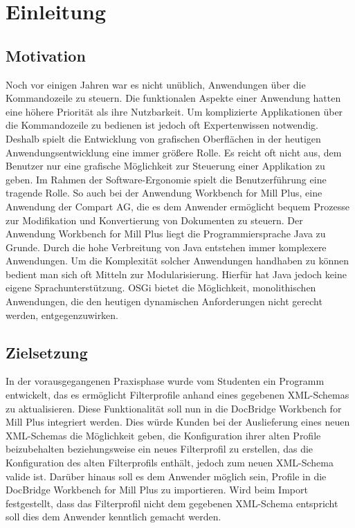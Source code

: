 
\chapter{Einleitung}
\label{cha:Einleitung}

\section{Motivation}{
Noch vor einigen Jahren war es nicht unüblich, Anwendungen über die Kommandozeile zu steuern. Die funktionalen Aspekte einer Anwendung hatten eine höhere Priorität als ihre Nutzbarkeit. Um komplizierte Applikationen über die Kommandozeile zu bedienen ist jedoch oft Expertenwissen notwendig. Deshalb spielt die Entwicklung von grafischen Oberflächen in der heutigen Anwendungsentwicklung eine immer größere Rolle. Es reicht oft nicht aus, dem Benutzer nur eine grafische Möglichkeit zur Steuerung einer Applikation zu geben. Im Rahmen der Software-Ergonomie spielt die Benutzerführung eine tragende Rolle. So auch bei der Anwendung Workbench for Mill Plus, eine Anwendung der Compart AG, die es dem Anwender ermöglicht bequem Prozesse zur Modifikation und Konvertierung von Dokumenten zu steuern. Der Anwendung Workbench for Mill Plus liegt die Programmiersprache Java zu Grunde. Durch die hohe Verbreitung von Java entstehen immer komplexere Anwendungen. Um die Komplexität solcher Anwendungen handhaben zu können bedient man sich oft Mitteln zur Modularisierung. Hierfür hat Java jedoch keine eigene Sprachunterstützung. \ac{OSGi} bietet die Möglichkeit, monolithischen Anwendungen, die den heutigen dynamischen Anforderungen nicht gerecht werden, entgegenzuwirken.
}
\section{Zielsetzung}{
In der vorausgegangenen Praxisphase wurde vom Studenten ein Programm entwickelt, das es ermöglicht Filterprofile anhand eines gegebenen XML-Schemas zu aktualisieren. Diese Funktionalität soll nun in die DocBridge Workbench for Mill Plus integriert werden. Dies würde Kunden bei der Auslieferung eines neuen XML-Schemas die Möglichkeit geben, die Konfiguration ihrer alten Profile beizubehalten beziehungsweise ein neues Filterprofil zu erstellen, das die Konfiguration des alten Filterprofils enthält, jedoch zum neuen XML-Schema valide ist. Darüber hinaus soll es dem Anwender möglich sein, Profile in die DocBridge Workbench for Mill Plus zu importieren. Wird beim Import festgestellt, dass das Filterprofil nicht dem gegebenen XML-Schema entspricht soll dies dem Anwender kenntlich gemacht werden. 
}
